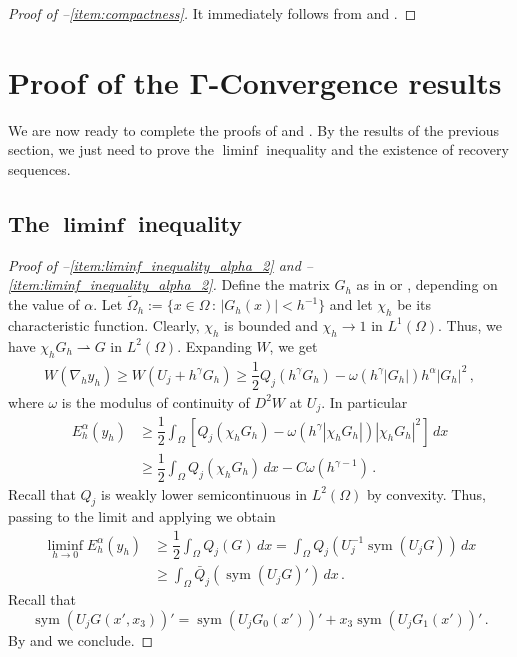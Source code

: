 \documentclass{article}
\theoremstyle{plain}
\theoremstyle{plain}
\theoremstyle{plain}
\theoremstyle{plain}
\theoremstyle{plain}
\theoremstyle{definition}
\theoremstyle{definition}
\newcommand{\todeb}{\rightharpoonup}
\DeclareMathOperator{\sym}{sym}
\begin{document}
\begin{proof}[Proof of --\ref{item:compactness}]
    It immediately follows from  and .
\end{proof}


\section{Proof of the \texorpdfstring{$\bm{\Gamma}$}{}-Convergence results}\label{section:gamma-convergence}

We are now ready to complete the proofs of  and . By the results of the previous section, we just need to prove the $\liminf$ inequality and the existence of recovery sequences.

\subsection{The \texorpdfstring{$\bm{\liminf}$}{liminf} inequality}

\begin{proof}[Proof of --\ref{item:liminf_inequality_alpha_2} and --\ref{item:liminf_inequality_alpha_2}]
    Define the\textsf{} matrix $G_h$ as in  or , depending on the value of $\alpha$. Let $\tilde \Omega_h := \{x  \in \Omega \, : \, |G_h(x)| < h^{-1}\}$ and let $\chi_h$ be its characteristic function. Clearly, $\chi_h$ is bounded and $\chi_h \to 1$ in $L^1(\Omega)$. Thus, we have $\chi_h G_h \todeb G$ in $L^2(\Omega)$. Expanding $W$, we get
    \begin{align}
        W(\nabla_h y_h) \geq W(U_j + h^{\gamma} G_h) \geq \dfrac{1}{2} Q_j(h^{\gamma} G_h) - \omega(h^{\gamma} |G_h|) h^{\alpha} |G_h|^2 \,,    
    \end{align}
    where $\omega$ is the modulus of continuity of $D^2W$ at $U_j$. In particular
    \begin{align}
        E_h^\alpha(y_h) & \geq \dfrac{1}{2} \int_\Omega \left[Q_j(\chi_h G_h) - \omega(h^\gamma |\chi_h G_h|)|\chi_h G_h|^2 \right]\, dx\\
        & \geq \dfrac{1}{2} \int_\Omega Q_j(\chi_h G_h) \, dx - C \omega(h^{\gamma-1})\,.
    \end{align}
    Recall that $Q_j$ is weakly lower semicontinuous in $L^2(\Omega)$ by convexity. Thus, passing to the limit and applying  we obtain
    \begin{align}
        \liminf_{h \to 0} E_h^\alpha(y_h) & \geq \dfrac{1}{2} \int_\Omega Q_j(G) \, dx = \int_\Omega Q_j(U_j^{-1}\sym(U_j G)) \, dx\\
        & \geq \int_\Omega \bar Q_j(\sym(U_j G)') \, dx \,.
    \end{align}
    Recall that
    \[
        \sym(U_j G(x', x_3))' = \sym(U_j G_0(x'))' + x_3 \sym(U_j G_1(x'))' \,.
    \]
    By  and  we conclude.
\end{proof}
\end{document}

